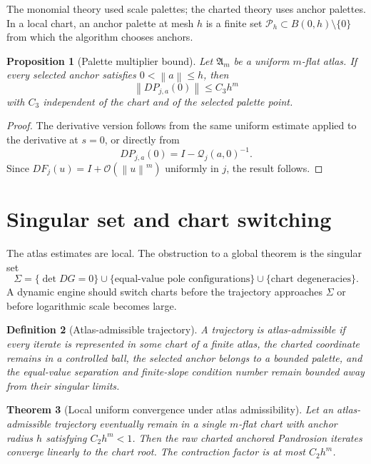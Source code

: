 \documentclass[11pt]{article}
\newtheorem{definition}{Definition}[section]
\newtheorem{theorem}[definition]{Theorem}
\newtheorem{proposition}[definition]{Proposition}
\newcommand{\Oterm}{\mathcal O}
\newcommand{\Q}{\mathcal Q}
\newcommand{\A}{\mathfrak A}
\newcommand{\norm}[1]{\left\lVert #1\right\rVert}
\begin{document}
The monomial theory used scale palettes; the charted theory uses anchor palettes. In a local chart, an anchor palette at mesh \(h\) is a finite set \(\mathcal P_h\subset B(0,h)\setminus\{0\}\) from which the algorithm chooses anchors.

\begin{proposition}[Palette multiplier bound]\label{prop:palette}
Let \(\A_m\) be a uniform \(m\)-flat atlas. If every selected anchor satisfies \(0<\norm{a}\le h\), then
\[
        \norm{D P_{j,a}(0)}\le C_3 h^m
\]
with \(C_3\) independent of the chart and of the selected palette point.
\end{proposition}

\begin{proof}
The derivative version follows from the same uniform estimate applied to the derivative at \(s=0\), or directly from
\[
        D P_{j,a}(0)=I-\Q_j(a,0)^{-1}.
\]
Since \(DF_j(u)=I+\Oterm(\norm{u}^{m})\) uniformly in \(j\), the result follows.
\end{proof}

\section{Singular set and chart switching}

The atlas estimates are local. The obstruction to a global theorem is the singular set
\[
        \Sigma
        =
        \{\det DG=0\}
        \cup
        \{\text{equal-value pole configurations}\}
        \cup
        \{\text{chart degeneracies}\}.
\]
A dynamic engine should switch charts before the trajectory approaches \(\Sigma\) or before logarithmic scale becomes large.

\begin{definition}[Atlas-admissible trajectory]
A trajectory is atlas-admissible if every iterate is represented in some chart of a finite atlas, the charted coordinate remains in a controlled ball, the selected anchor belongs to a bounded palette, and the equal-value separation and finite-slope condition number remain bounded away from their singular limits.
\end{definition}

\begin{theorem}[Local uniform convergence under atlas admissibility]\label{thm:admissible}
Let an atlas-admissible trajectory eventually remain in a single \(m\)-flat chart with anchor radius \(h\) satisfying \(C_2h^m<1\). Then the raw charted anchored Pandrosion iterates converge linearly to the chart root. The contraction factor is at most \(C_2h^m\).
\end{theorem}
\end{document}

